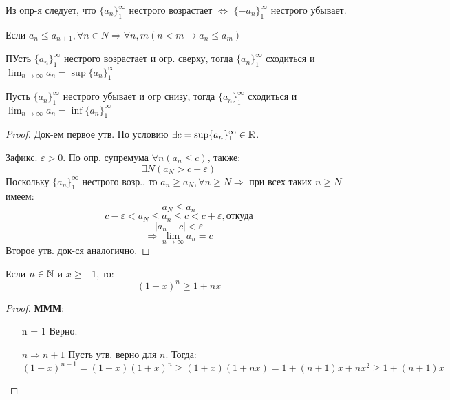 \begin{note}
Из опр-я следует, что $\{a_n\}_{1}^{\infty}$ нестрого возрастает $\iff$ $\{-a_n\}_{1}^{\infty}$ нестрого убывает.
\end{note}
\begin{note}
Если $a_n \leq a_{n + 1}, \forall n \in N \Rightarrow \forall n, m (n < m \rightarrow a_n \leq a_m)$
\end{note}
\begin{theorem}
ПУсть $\{a_n\}_{1}^{\infty}$ нестрого возрастает и огр. сверху, тогда $\{a_n\}_{1}^{\infty}$ сходиться и $\lim_{n\to\infty} a_n = \sup \{a_n\}_{1}^{\infty}$

Пусть $\{a_n\}_{1}^{\infty}$ нестрого убывает и огр снизу, тогда $\{a_n\}_{1}^{\infty}$ сходиться и $\lim_{n\to\infty} a_n = \inf \{a_n\}_{1}^{\infty}$
\end{theorem}
\begin{proof}
Док-ем первое утв. По условию $\exists c = \sup \{a_n\}_{1}^{\infty} \in \mathbb{R}$.

Зафикс. $\varepsilon > 0$. По опр. супремума $\forall n (a_n \leq c)$, также:
\[
\exists N (a_N > c - \varepsilon)
\] 
Поскольку $\{a_n\}_{1}^{\infty}$ нестрого возр., то $a_n \geq a_N, \forall n \geq N \Rightarrow$ при всех таких $n \geq N$ имеем:
\[
a_N \leq a_n
\] 
\[
c - \varepsilon < a_N \leq a_n \leq c < c + \varepsilon, \text{откуда}
\]
\[
|a_n - c| < \varepsilon
\] 
\[
  \Rightarrow \lim_{n\to\infty}a_n = c
\]
Второе утв. док-ся аналогично.
\end{proof}

\begin{lemma}
Если $n \in \mathbb{N}$ и $x \geq -1$, то:
\[
  (1 + x)^{n} \geq 1 + nx
\] 
\end{lemma}
\begin{proof}
\textbf{МММ}:
\begin{itemize}
  \item [n = 1] Верно.
  \item [$n \Rightarrow n + 1$] Пусть утв. верно для $n$. Тогда:
    \[
      (1 + x)^{n + 1} = (1 + x)(1 + x)^{n} \geq (1+x)(1 + nx) = 1 + (n + 1)x + n x^{2} \geq 1 + (n + 1)x
    \] 
\end{itemize}
\end{proof}

